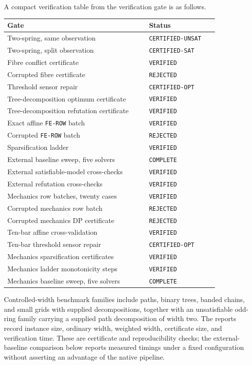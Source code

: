 \documentclass[11pt]{article}
\theoremstyle{plain}
\theoremstyle{definition}
\theoremstyle{remark}
\begin{document}
A compact verification table from the verification gate is as follows.
\begin{center}
\begin{tabular}{@{}p{0.58\linewidth}p{0.28\linewidth}@{}}
\toprule
Gate & Status\\
\midrule
Two-spring, same observation & \texttt{CERTIFIED-UNSAT}\\
Two-spring, split observation & \texttt{CERTIFIED-SAT}\\
Fibre conflict certificate & \texttt{VERIFIED}\\
Corrupted fibre certificate & \texttt{REJECTED}\\
Threshold sensor repair & \texttt{CERTIFIED-OPT}\\
Tree-decomposition optimum certificate & \texttt{VERIFIED}\\
Tree-decomposition refutation certificate & \texttt{VERIFIED}\\
Exact affine \texttt{FE-ROW} batch & \texttt{VERIFIED}\\
Corrupted \texttt{FE-ROW} batch & \texttt{REJECTED}\\
Sparsification ladder & \texttt{VERIFIED}\\
External baseline sweep, five solvers & \texttt{COMPLETE}\\
External satisfiable-model cross-checks & \texttt{VERIFIED}\\
External refutation cross-checks & \texttt{VERIFIED}\\
Mechanics row batches, twenty cases & \texttt{VERIFIED}\\
Corrupted mechanics row batch & \texttt{REJECTED}\\
Corrupted mechanics DP certificate & \texttt{REJECTED}\\
Ten-bar affine cross-validation & \texttt{VERIFIED}\\
Ten-bar threshold sensor repair & \texttt{CERTIFIED-OPT}\\
Mechanics sparsification certificates & \texttt{VERIFIED}\\
Mechanics ladder monotonicity steps & \texttt{VERIFIED}\\
Mechanics baseline sweep, five solvers & \texttt{COMPLETE}\\
\bottomrule
\end{tabular}
\end{center}

Controlled-width benchmark families include paths, binary trees,
banded chains, and small grids with supplied decompositions, together with an
unsatisfiable odd-ring family carrying a supplied path decomposition of width
two.  The reports record instance size, ordinary width, weighted width,
certificate size, and verification time.  These are certificate and
reproducibility checks; the external-baseline comparison below reports measured
timings under a fixed configuration without asserting an advantage of the
native pipeline.
\end{document}
